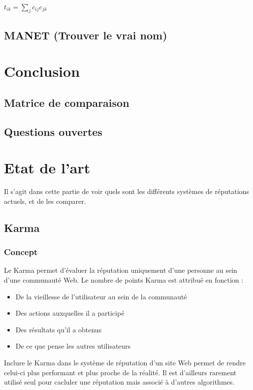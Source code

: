 \documentclass[a4paper, 11pt]{article} %
\begin{document}
\paragraph{}
$t_{ik} = \sum_{j} c_{ij}c_{jk}$
\paragraph{}

\subsection{MANET (Trouver le vrai nom)}

\section{Conclusion}
\subsection{Matrice de comparaison}
\subsection{Questions ouvertes}

\section{Etat de l'art}
Il s'agit dans cette partie de voir quels sont les différents systèmes de réputations actuels, et de les comparer.


\subsection{Karma}
\subsubsection{Concept}
Le Karma permet d'évaluer la réputation uniquement d'une personne au sein d'une communauté Web. Le nombre de points Karma est attribué en fonction :
\begin{itemize}
	\item De la vieillesse de l'utilisateur au sein de la communauté
	\item Des actions auxquelles il a participé
	\item Des résultats qu'il a obtenus
	\item De ce que pense les autres utilisateurs
\end{itemize}
Inclure le Karma dans le système de réputation d'un site Web permet de rendre celui-ci plus performant et plus proche de la réalité. Il est d'ailleurs rarement utilisé seul pour cacluler une réputation mais associé à d'autres algorithmes.
\end{document}
